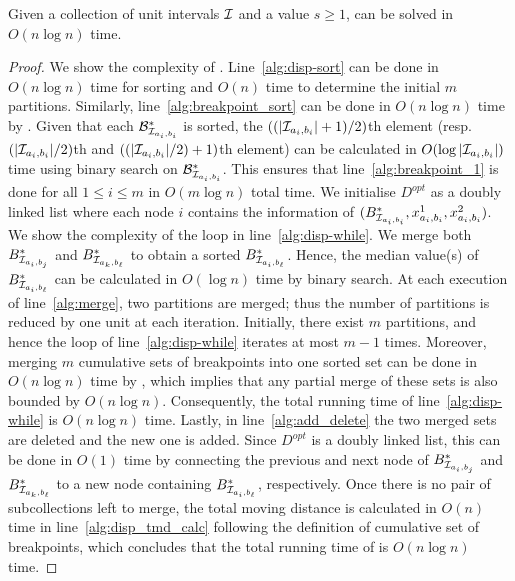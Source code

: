 \begin{theorem}\label{thm:interval_dispersion}
    Given a collection of unit intervals $\mathcal{I}$ and a value $s\ge 1$, {\idisp} can be solved in $O(n\log n)$ time.
\end{theorem}
\begin{proof}
    We show the complexity of . 
    Line~\ref{alg:disp-sort} can be done in $O(n\log n)$ time for sorting and $O(n)$ time to determine the initial $m$ partitions.
    Similarly, line~\ref{alg:breakpoint_sort} can be done in $O(n\log n)$ time by .
    Given that each $\mathcal{B}^*_{\mathcal{I}_{a_i,b_i}}$ is sorted, the $((|\mathcal{I}_{a_i,b_i}|+1)/2)$th element (resp. $(|\mathcal{I}_{a_i,b_i}|/2)$th and $((|\mathcal{I}_{a_i,b_i}|/2)+1)$th element) can be calculated in $O(\log |\mathcal{I}_{a_i,b_i}|)$ time using binary search on $\mathcal{B}^*_{\mathcal{I}_{a_i,b_i}}$.
    This ensures that line~\ref{alg:breakpoint_1} is done for all $1\le i \le m$ in $O(m\log n)$ total time.
    We initialise $D^{\mathit{opt}}$ as a doubly linked list where each node $i$ contains the information of $(B^*_{\mathcal{I}_{a_i,b_i}},x^1_{a_i,b_{i}},x^2_{a_i,b_{i}})$.
    We show the complexity of the loop in line~\ref{alg:disp-while}.
    We merge both $B^*_{\mathcal{I}_{a_i,b_j}}$ and $B^*_{\mathcal{I}_{a_k,b_\ell}}$ to obtain a sorted $B^*_{\mathcal{I}_{a_i,b_\ell}}$.
    Hence, the median value(s) of $B^*_{\mathcal{I}_{a_i,b_\ell}}$ can be calculated in $O(\log n)$ time by binary search.
    At each execution of line~\ref{alg:merge}, two partitions are merged; thus the number of partitions is reduced by one unit at each iteration.
    Initially, there exist $m$ partitions, and hence the loop of line~\ref{alg:disp-while} iterates at most $m-1$ times.
    Moreover, merging $m$ cumulative sets of breakpoints into one sorted set can be done in $O(n\log n)$ time by , which implies that any partial merge of these sets is also bounded by $O(n\log n)$.
    Consequently, the total running time of line~\ref{alg:disp-while} is $O(n\log n)$ time.
    Lastly, in line~\ref{alg:add_delete} the two merged sets are deleted and the new one is added. 
    Since $D^{\mathit{opt}}$ is a doubly linked list, this can be done in $O(1)$ time by connecting the previous and next node of $B^*_{\mathcal{I}_{a_i,b_j}}$ and $B^*_{\mathcal{I}_{a_k,b_\ell}}$ to a new node containing $B^*_{\mathcal{I}_{a_i,b_\ell}}$, respectively.
    Once there is no pair of subcollections left to merge, the total moving distance is calculated in $O(n)$ time in line~\ref{alg:disp_tmd_calc} following the definition of cumulative set of breakpoints, which concludes that the total running time of  is $O(n\log n)$ time.
\end{proof}

